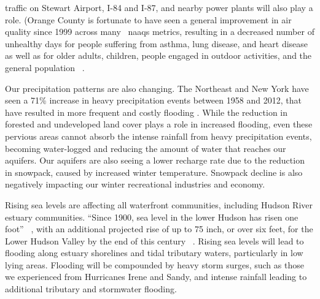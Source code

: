 traffic on Stewart Airport, I-84 and I-87, and nearby power plants will also 
play a role. (Orange County is fortunate to have seen a general improvement in 
air quality since 1999 across many ~\gls{naaqs} metrics, resulting in a decreased 
number of unhealthy days for people suffering from asthma, lung disease, and 
heart disease as well as for older adults, children, people engaged in outdoor 
activities, and the general population ~\citep{aircompare, ocnysenvironmental}. 
\par
Our precipitation patterns are also changing. The Northeast and New York have 
seen a 71\% increase in heavy precipitation events between 1958 and 2012, that 
have resulted in more frequent and costly flooding \citep{melillo2014climate}. 
While the reduction in forested and undeveloped land cover plays a role in 
increased flooding, even these pervious areas cannot absorb the intense rainfall 
from heavy precipitation events, becoming water-logged and reducing the amount 
of water that reaches our aquifers. Our aquifers are also seeing a lower 
recharge rate due to the reduction in snowpack, caused by increased winter 
temperature. Snowpack decline is also negatively impacting our winter 
recreational industries and economy.
\par
Rising sea levels are affecting all waterfront communities, including Hudson 
River estuary communities. ``Since 1900, sea level in the lower Hudson has 
risen one foot'' ~\citep{haeckel2014}, with an additional projected rise of up 
to 75 inch, or over six feet, for the Lower Hudson Valley by the end of this 
century ~\citep{horton2014climate}. Rising sea levels will lead to flooding along 
estuary shorelines and tidal tributary waters, particularly in low lying areas. 
Flooding will be compounded by heavy storm surges, such as those we experienced 
from Hurricanes Irene and Sandy, and intense rainfall leading to additional 
tributary and stormwater flooding.

\label{map:coastalclimatechange}
